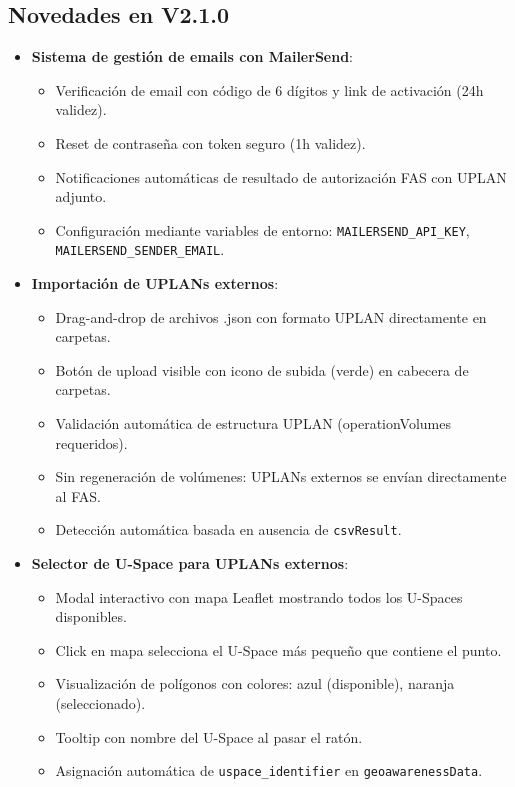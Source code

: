 \documentclass[12pt,a4paper]{article}
\begin{document}
\subsection*{Novedades en V2.1.0}
\begin{itemize}
    \item \textbf{Sistema de gestión de emails con MailerSend}:
    \begin{itemize}
        \item Verificación de email con código de 6 dígitos y link de activación (24h validez).
        \item Reset de contraseña con token seguro (1h validez).
        \item Notificaciones automáticas de resultado de autorización FAS con UPLAN adjunto.
        \item Configuración mediante variables de entorno: \texttt{MAILERSEND\_API\_KEY}, \texttt{MAILERSEND\_SENDER\_EMAIL}.
    \end{itemize}
    \item \textbf{Importación de UPLANs externos}:
    \begin{itemize}
        \item Drag-and-drop de archivos .json con formato UPLAN directamente en carpetas.
        \item Botón de upload visible con icono de subida (verde) en cabecera de carpetas.
        \item Validación automática de estructura UPLAN (operationVolumes requeridos).
        \item Sin regeneración de volúmenes: UPLANs externos se envían directamente al FAS.
        \item Detección automática basada en ausencia de \texttt{csvResult}.
    \end{itemize}
    \item \textbf{Selector de U-Space para UPLANs externos}:
    \begin{itemize}
        \item Modal interactivo con mapa Leaflet mostrando todos los U-Spaces disponibles.
        \item Click en mapa selecciona el U-Space más pequeño que contiene el punto.
        \item Visualización de polígonos con colores: azul (disponible), naranja (seleccionado).
        \item Tooltip con nombre del U-Space al pasar el ratón.
        \item Asignación automática de \texttt{uspace\_identifier} en \texttt{geoawarenessData}.

\end{itemize}
\end{itemize}
\end{document}
